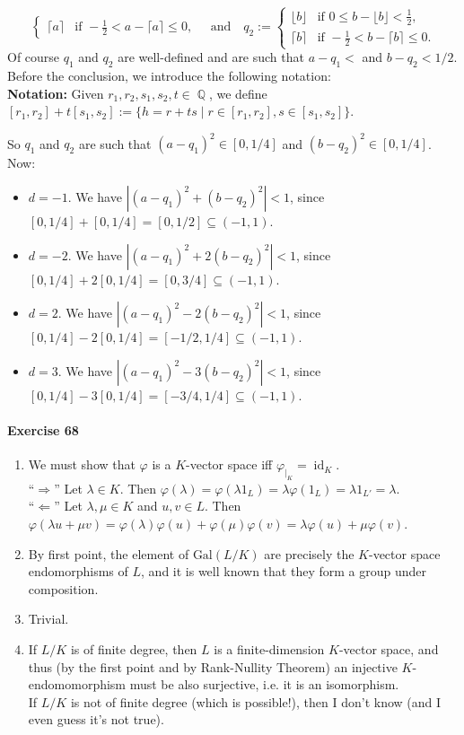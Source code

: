 \documentclass[12pt,a4paper]{report}
\theoremstyle{definition}
\theoremstyle{num.custom-title}
\DeclareMathOperator{\id}{id}
\DeclareMathOperator{\Q}{\mathbb{Q}}
\DeclareMathOperator{\imp}{\Rightarrow}
\DeclareMathOperator{\sse}{\subseteq}
\renewcommand{\phi}{\varphi}
\begin{document}
\begin{enumerate}
\[\begin{cases}
\lceil a \rceil & \text{if } -\frac{1}{2} < a - \lceil a \rceil \leq 0,
\end{cases}
\quad \text{and} \quad
q_2 :=
\begin{cases}
\lfloor b \rfloor & \text{if } 0 \leq b - \lfloor b \rfloor < \frac{1}{2}, \\
\lceil b \rceil & \text{if } -\frac{1}{2} < b - \lceil b \rceil \leq 0.
\end{cases}
\]
Of course $q_1$ and $q_2$ are well-defined and are such that $a-q_1 < $ and $b-q_2 < 1/2$. Before the conclusion, we introduce the following notation:\\
\textbf{Notation:} Given $r_1,r_2,s_1,s_2,t \in \Q$, we define $[r_1,r_2]+t[s_1,s_2] := \{h = r +ts \mid r \in [r_1,r_2], s \in [s_1,s_2]\}$.

So $q_1$ and $q_2$ are such that $(a-q_1)^2 \in [0,1/4]$ and $(b-q_2)^2 \in [0,1/4]$. Now:
\begin{itemize}
\item $d=-1$. We have $|(a-q_1)^2+(b-q_2)^2| < 1$, since $[0,1/4]+[0,1/4] = [0,1/2] \sse (-1,1)$.
\item $d=-2$. We have $|(a-q_1)^2+2(b-q_2)^2| < 1$, since $[0,1/4]+2[0,1/4] = [0,3/4] \sse (-1,1)$.
\item $d=2$. We have $|(a-q_1)^2-2(b-q_2)^2| < 1$, since $[0,1/4]-2[0,1/4] = [-1/2,1/4] \sse (-1,1)$.
\item $d=3$. We have $|(a-q_1)^2-3(b-q_2)^2| < 1$, since $[0,1/4]-3[0,1/4] = [-3/4,1/4] \sse (-1,1)$.
\end{itemize}

\end{enumerate}

\paragraph{Exercise 68}
\begin{enumerate}
\item We must show that $\phi$ is a $K$-vector space iff $\phi_{|_K} = \id_K$.\\
``$\imp$'' Let $\lambda \in K$. Then $\phi(\lambda) = \phi(\lambda 1_L) = \lambda \phi(1_L) = \lambda 1_{L'} = \lambda$.\\
``$\Leftarrow$'' Let $\lambda,\mu \in K$ and $u,v \in L$. Then $\phi(\lambda u + \mu v) = \phi(\lambda) \phi(u) + \phi(\mu) \phi(v) = \lambda \phi(u) + \mu \phi(v)$.
\item By first point, the element of $\text{Gal}(L/K)$ are precisely the $K$-vector space endomorphisms of $L$, and it is well known that they form a group under composition.
\item Trivial.
\item If $L/K$ is of finite degree, then $L$ is a finite-dimension $K$-vector space, and thus (by the first point and by Rank-Nullity Theorem) an injective $K$-endomomorphism must be also surjective, i.e. it is an isomorphism.\\
If $L/K$ is not of finite degree (which is possible!), then I don't know (and I even guess it's not true).
\end{enumerate}
\end{document}
